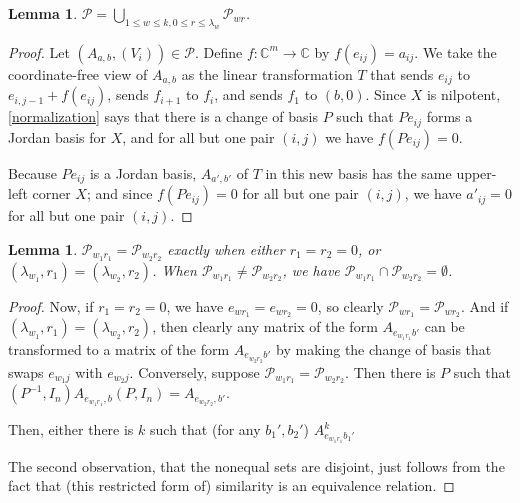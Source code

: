 \documentclass[12pt,psamsfonts]{article}
\newtheorem{lemma}[theorem]{Lemma}
\begin{document}
\begin{lemma}
    \(\mathcal{P} = \bigcup_{1 \leq w \leq k, 0 \leq r \leq \lambda_{w}} \mathcal{P}_{wr}\).
\end{lemma}
\begin{proof}
    Let \((A_{a, b}, (V_i)) \in \mathcal{P}\).
    Define \(f : \mathbb{C}^m \to \mathbb{C}\) by \(f(e_{ij}) = a_{ij}\).
    We take the coordinate-free view of \(A_{a,b}\) as the linear transformation \(T\) that sends \(e_{ij}\) to \(e_{i,j - 1} + f(e_{ij})\), sends \(f_{i + 1}\) to \(f_i\), and sends \(f_1\) to \((b, 0)\).
    Since \(X\) is nilpotent, \cref{normalization} says that there is a change of basis \(P\) such that \(Pe_{ij}\) forms a Jordan basis for \(X\), and for all but one pair \((i, j)\) we have \(f(Pe_{ij}) = 0\).
    \par Because \(Pe_{ij}\) is a Jordan basis, \(A_{a',b'}\) of \(T\) in this new basis has the same upper-left corner \(X\); and since \(f(Pe_{ij}) = 0\) for all but one pair \((i,j)\), we have \(a'_{ij} = 0\) for all but one pair \((i,j)\).
\end{proof}
\begin{lemma}
    \(\mathcal{P}_{w_1r_1} = \mathcal{P}_{w_2r_2}\) exactly when either \(r_1 = r_2 = 0\), or \((\lambda_{w_1}, r_1) = (\lambda_{w_2}, r_2)\).
    When \(\mathcal{P}_{w_1r_1} \neq \mathcal{P}_{w_2r_2}\), we have \(\mathcal{P}_{w_1r_1} \cap \mathcal{P}_{w_2r_2} = \emptyset\). 
\end{lemma}
\begin{proof}
    Now, if \(r_1 = r_2 = 0\), we have \(e_{wr_1} = e_{wr_2} = 0\), so clearly \(\mathcal{P}_{wr_1} = \mathcal{P}_{wr_2}\).
    And if \((\lambda_{w_1}, r_1) = (\lambda_{w_2}, r_2)\), then clearly any matrix of the form \(A_{e_{w_1r_1}b'}\) can be transformed to a matrix of the form \(A_{e_{w_2r_2}b'}\) by making the change of basis that swaps \(e_{w_1j}\) with \(e_{w_2j}\).
    Conversely, suppose \(\mathcal{P}_{w_1r_1} = \mathcal{P}_{w_2r_2}\).
    Then there is \(P\) such that \((P^{-1},I_n) A_{e_{w_1r_1},b} (P, I_n) = A_{e_{w_2r_2}, b'}\).

    Then, either there is \(k\) such that (for any \(b_1',b_2'\)) \(A_{e_{w_1r_1}b_1'}^k \)
    \par The second observation, that the nonequal sets are disjoint, just follows from the fact that (this restricted form of) similarity is an equivalence relation.
\end{proof}
\end{document}

